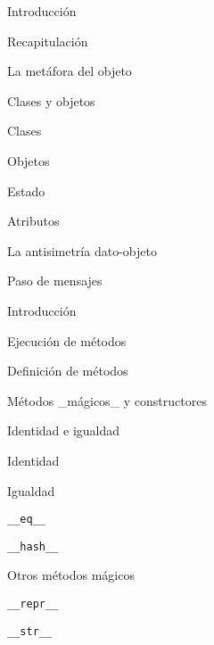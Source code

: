 \begin{longenum}
    \begin{longenum}
        \item Introducción
        \begin{longenum}
            \item Recapitulación
            \item La metáfora del objeto
        \end{longenum}
        \item Clases y objetos
        \begin{longenum}
            \item Clases
            \item Objetos
            \item Estado
            \begin{longenum}
                \item Atributos
            \end{longenum}
            \item La antisimetría dato-objeto
        \end{longenum}
        \item Paso de mensajes
        \begin{longenum}
            \item Introducción
            \item Ejecución de métodos
            \item Definición de métodos
            \item Métodos \_mágicos\_ y constructores
        \end{longenum}
        \item Identidad e igualdad
        \begin{longenum}
            \item Identidad
            \item Igualdad
            \begin{longenum}
                \item \texttt{\_\_eq\_\_}
                \item \texttt{\_\_hash\_\_}
            \end{longenum}
            \item Otros métodos mágicos
            \begin{longenum}
                \item \texttt{\_\_repr\_\_}
                \item \texttt{\_\_str\_\_}
            \end{longenum}
        \end{longenum}

\end{longenum}
\end{longenum}
